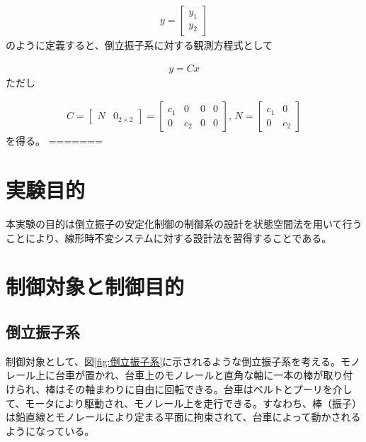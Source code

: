\documentclass[a4j,11pt,twoside]{ujbook}
\begin{document}
\begin{eqnarray}
	y = \left[
	\begin{array}{c}
		y_1\\
		y_2
	\end{array}
	\right]
\end{eqnarray}
のように定義すると、倒立振子系に対する観測方程式として

\begin{eqnarray}
	y = Cx
\end{eqnarray}
ただし

\begin{eqnarray}
C = \left[
\begin{array}{cc}
N & 0_{2\times2}
\end{array}
\right] = \left[
\begin{array}{cccc}
c_1 &  0  & 0 & 0\\
0  & c_2 & 0 & 0
\end{array}
\right],\,
N = \left[
\begin{array}{cc}
c_1 &  0 \\
0  & c_2
\end{array}
\right]
\label{eq:C,N}
\end{eqnarray}
を得る。
=======
	\section{実験目的}
		本実験の目的は倒立振子の安定化制御の制御系の設計を状態空間法を用いて行うことにより、線形時不変システムに対する設計法を習得することである。
	\section{制御対象と制御目的}
		\subsection{倒立振子系}
			制御対象として、図\ref{fig:倒立振子系}に示されるような倒立振子系を考える。モノレール上に台車が置かれ、台車上のモノレールと直角な軸に一本の棒が取り付けられ、棒はその軸まわりに自由に回転できる。台車はベルトとプーリを介して、モータにより駆動され、モノレール上を走行できる。すなわち、棒（振子）は鉛直線とモノレールにより定まる平面に拘束されて、台車によって動かされるようになっている。
\end{document}
